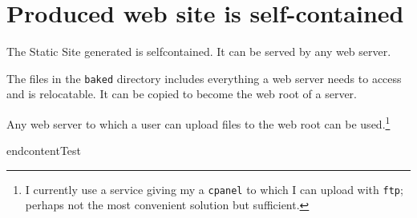 \documentclass{tufte-book}
\begin{document}
\chapter{Produced web site is self-contained}
\begin{mdframed}The Static Site generated is selfcontained. It can be served by any web server.\end{mdframed}
The files in the \texttt{baked} directory includes everything a web
server needs to access and is relocatable. It can be copied to become
the web root of a server.

Any web server to which a user can upload files to the web root can be
used.\footnote{I currently use a service giving my a \texttt{cpanel} to
	which I can upload with \texttt{ftp}; perhaps not the most convenient
	solution but sufficient.}





endcontentTest

\backmatter





\printindex
\end{document}
